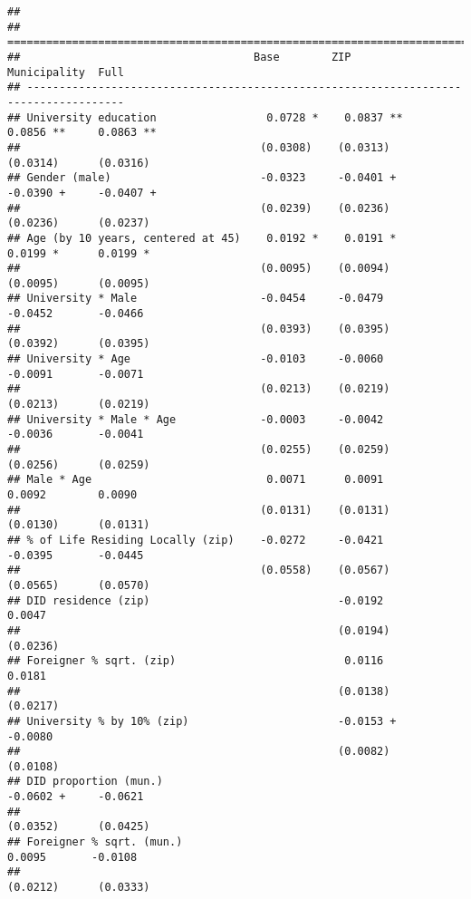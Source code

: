 \documentclass[
]{article}
\begin{document}
\begin{verbatim}
## 
## =====================================================================================
##                                    Base        ZIP          Municipality  Full       
## -------------------------------------------------------------------------------------
## University education                 0.0728 *    0.0837 **    0.0856 **     0.0863 **
##                                     (0.0308)    (0.0313)     (0.0314)      (0.0316)  
## Gender (male)                       -0.0323     -0.0401 +    -0.0390 +     -0.0407 + 
##                                     (0.0239)    (0.0236)     (0.0236)      (0.0237)  
## Age (by 10 years, centered at 45)    0.0192 *    0.0191 *     0.0199 *      0.0199 * 
##                                     (0.0095)    (0.0094)     (0.0095)      (0.0095)  
## University * Male                   -0.0454     -0.0479      -0.0452       -0.0466   
##                                     (0.0393)    (0.0395)     (0.0392)      (0.0395)  
## University * Age                    -0.0103     -0.0060      -0.0091       -0.0071   
##                                     (0.0213)    (0.0219)     (0.0213)      (0.0219)  
## University * Male * Age             -0.0003     -0.0042      -0.0036       -0.0041   
##                                     (0.0255)    (0.0259)     (0.0256)      (0.0259)  
## Male * Age                           0.0071      0.0091       0.0092        0.0090   
##                                     (0.0131)    (0.0131)     (0.0130)      (0.0131)  
## % of Life Residing Locally (zip)    -0.0272     -0.0421      -0.0395       -0.0445   
##                                     (0.0558)    (0.0567)     (0.0565)      (0.0570)  
## DID residence (zip)                             -0.0192                     0.0047   
##                                                 (0.0194)                   (0.0236)  
## Foreigner % sqrt. (zip)                          0.0116                     0.0181   
##                                                 (0.0138)                   (0.0217)  
## University % by 10% (zip)                       -0.0153 +                  -0.0080   
##                                                 (0.0082)                   (0.0108)  
## DID proportion (mun.)                                        -0.0602 +     -0.0621   
##                                                              (0.0352)      (0.0425)  
## Foreigner % sqrt. (mun.)                                      0.0095       -0.0108   
##                                                              (0.0212)      (0.0333)  

\end{verbatim}
\end{document}
